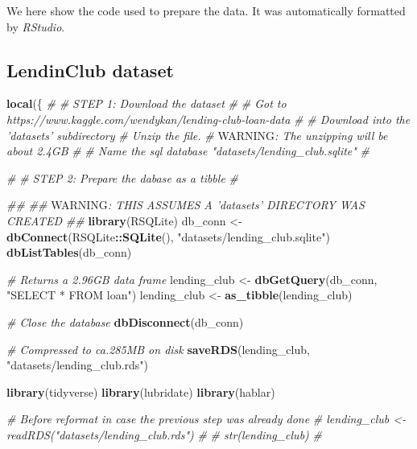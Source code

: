 \documentclass[11pt,]{report}
\newenvironment{Shaded}{\begin{snugshade}}{\end{snugshade}}
\newcommand{\AlertTok}[1]{\textcolor[rgb]{0.94,0.16,0.16}{#1}}
\newcommand{\CommentTok}[1]{\textcolor[rgb]{0.56,0.35,0.01}{\textit{#1}}}
\newcommand{\KeywordTok}[1]{\textcolor[rgb]{0.13,0.29,0.53}{\textbf{#1}}}
\newcommand{\NormalTok}[1]{#1}
\newcommand{\OperatorTok}[1]{\textcolor[rgb]{0.81,0.36,0.00}{\textbf{#1}}}
\newcommand{\StringTok}[1]{\textcolor[rgb]{0.31,0.60,0.02}{#1}}
\begin{document}
We here show the code used to prepare the data. It was automatically formatted by \emph{RStudio}.

\hypertarget{lendinclub-dataset}{%
\subsection{LendinClub dataset}\label{lendinclub-dataset}}

\begin{Shaded}
\begin{Highlighting}[numbers=left,,]
\KeywordTok{local}\NormalTok{(\{}
  \CommentTok{#}
  \CommentTok{# STEP 1: Download the dataset}
  \CommentTok{#}
  \CommentTok{#   Got to https://www.kaggle.com/wendykan/lending-club-loan-data}
  \CommentTok{#}
  \CommentTok{#   Download into the 'datasets' subdirectory}
  \CommentTok{#   Unzip the file.}
  \CommentTok{#   }\AlertTok{WARNING}\CommentTok{: The unzipping will be about 2.4GB}
  \CommentTok{#}
  \CommentTok{#   Name the sql database "datasets/lending_club.sqlite"}
  \CommentTok{#}
  
  \CommentTok{#}
  \CommentTok{# STEP 2: Prepare the dabase as a tibble}
  \CommentTok{#}
  
  \CommentTok{##}
  \CommentTok{## }\AlertTok{WARNING}\CommentTok{: THIS ASSUMES A 'datasets' DIRECTORY WAS CREATED}
  \CommentTok{## }
  \KeywordTok{library}\NormalTok{(RSQLite)}
\NormalTok{  db_conn <-}
\StringTok{    }\KeywordTok{dbConnect}\NormalTok{(RSQLite}\OperatorTok{::}\KeywordTok{SQLite}\NormalTok{(), }\StringTok{"datasets/lending_club.sqlite"}\NormalTok{)}
  \KeywordTok{dbListTables}\NormalTok{(db_conn)}
  
  \CommentTok{# Returns a 2.96GB data frame}
\NormalTok{  lending_club <-}\StringTok{ }\KeywordTok{dbGetQuery}\NormalTok{(db_conn, }\StringTok{"SELECT * FROM loan"}\NormalTok{)}
\NormalTok{  lending_club <-}\StringTok{ }\KeywordTok{as_tibble}\NormalTok{(lending_club)}
  
  \CommentTok{# Close the database}
  \KeywordTok{dbDisconnect}\NormalTok{(db_conn)}
  
  \CommentTok{# Compressed to ca.285MB on disk}
  \KeywordTok{saveRDS}\NormalTok{(lending_club, }\StringTok{"datasets/lending_club.rds"}\NormalTok{)}
  
  
  \KeywordTok{library}\NormalTok{(tidyverse)}
  \KeywordTok{library}\NormalTok{(lubridate)}
  \KeywordTok{library}\NormalTok{(hablar)}
  
  \CommentTok{# Before reformat in case the previous step was already done}
  \CommentTok{# lending_club <- readRDS("datasets/lending_club.rds")}
  \CommentTok{#}
  \CommentTok{# str(lending_club)}
  \CommentTok{#}
  

\end{Highlighting}
\end{Shaded}
\end{document}
